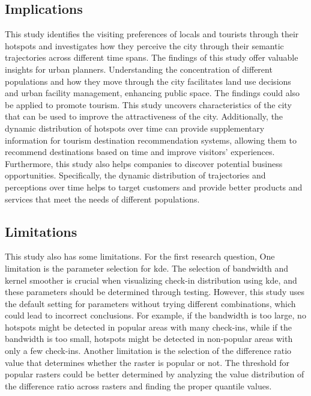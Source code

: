 \documentclass{article}
\theoremstyle{remark}
\begin{document}
\subsection{Implications} \label{discussion_implications}
This study identifies the visiting preferences of locals and tourists through their hotspots and investigates how they perceive the city through their semantic trajectories across different time spans. The findings of this study offer valuable insights for urban planners. Understanding the concentration of different populations and how they move through the city facilitates land use decisions and urban facility management, enhancing public space. The findings could also be applied to promote tourism. This study uncovers characteristics of the city that can be used to improve the attractiveness of the city. Additionally, the dynamic distribution of hotspots over time can provide supplementary information for tourism destination recommendation systems, allowing them to recommend destinations based on time and improve visitors' experiences. Furthermore, this study also helps companies to discover potential business opportunities. Specifically, the dynamic distribution of trajectories and perceptions over time helps to target customers and provide better products and services that meet the needs of different populations.


\subsection{Limitations} \label{discussion_limitations}
This study also has some limitations. For the first research question, One limitation is the parameter selection for \acrshort{kde}. The selection of bandwidth and kernel smoother is crucial when visualizing check-in distribution using \acrshort{kde}, and these parameters should be determined through testing. However, this study uses the default setting for parameters without trying different combinations, which could lead to incorrect conclusions. For example, if the bandwidth is too large, no hotspots might be detected in popular areas with many check-ins, while if the bandwidth is too small, hotspots might be detected in non-popular areas with only a few check-ins. Another limitation is the selection of the difference ratio value that determines whether the raster is popular or not. The threshold for popular rasters could be better determined by analyzing the value distribution of the difference ratio across rasters and finding the proper quantile values.
\end{document}
